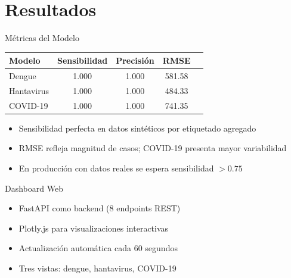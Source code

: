 \documentclass[10pt]{beamer}
\begin{document}
\section{Resultados}

\begin{frame}{Métricas del Modelo}
  \begin{table}
    \centering
    \begin{tabular}{lcccc}
      \toprule
      \textbf{Modelo} & \textbf{Sensibilidad} & \textbf{Precisión} & \textbf{RMSE} \\
      \midrule
      Dengue & 1.000 & 1.000 & 581.58 \\
      Hantavirus & 1.000 & 1.000 & 484.33 \\
      COVID-19 & 1.000 & 1.000 & 741.35 \\
      \bottomrule
    \end{tabular}
  \end{table}

  \begin{itemize}
    \item Sensibilidad perfecta en datos sintéticos por etiquetado agregado
    \item RMSE refleja magnitud de casos; COVID-19 presenta mayor variabilidad
    \item En producción con datos reales se espera sensibilidad $> 0.75$
  \end{itemize}
\end{frame}

\begin{frame}{Dashboard Web}
  \centering
  
  \begin{itemize}
    \item FastAPI como backend (8 endpoints REST)
    \item Plotly.js para visualizaciones interactivas
    \item Actualización automática cada 60 segundos
    \item Tres vistas: dengue, hantavirus, COVID-19
  \end{itemize}
\end{frame}
\end{document}

